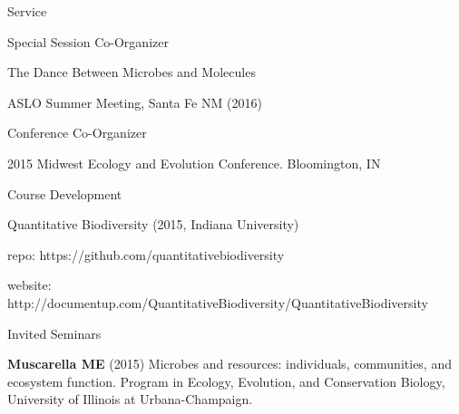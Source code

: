 \documentclass{resume} %
\begin{document}
\begin{rSection}{Service}
    \begin{rSubsection}{Special Session Co-Organizer}{}{}{}
        \item The Dance Between Microbes and Molecules
				\item ASLO Summer Meeting, Santa Fe NM (2016)
    \end{rSubsection}

    \begin{rSubsection}{Conference Co-Organizer}{}{}{}
        \item 2015 Midwest Ecology and Evolution Conference.
				Bloomington, IN
    \end{rSubsection}

    \begin{rSubsection}{Course Development}{}{}{}
        \item Quantitative Biodiversity (2015, Indiana University)
        \item \hspace{2ex} repo: https://github.com/quantitativebiodiversity
        \item \hspace{2ex} website:
        http://documentup.com/QuantitativeBiodiversity/QuantitativeBiodiversity
    \end{rSubsection}

\end{rSection}


\begin{rSection}{Invited Seminars}

  {\bf Muscarella ME} (2015) Microbes and resources: individuals, communities,
	and ecosystem function. Program in Ecology, Evolution, and Conservation
	Biology, University of Illinois at Urbana-Champaign.

\end{rSection}

\end{document}
